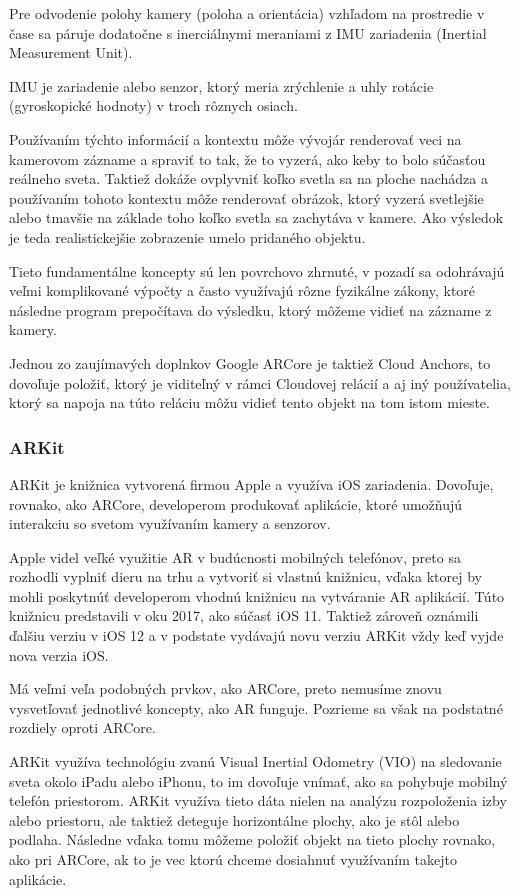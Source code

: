 Pre odvodenie polohy kamery (poloha a orientácia) vzhľadom na prostredie v čase sa páruje dodatočne s inerciálnymi meraniami z IMU zariadenia (Inertial Measurement Unit). \cite{conway2023arcore}

IMU je zariadenie alebo senzor, ktorý meria zrýchlenie a uhly rotácie (gyroskopické hodnoty) v troch rôznych osiach. \cite{vectornav2024imu}

Používaním týchto informácií a kontextu môže vývojár renderovať veci na kamerovom zázname a spraviť to tak, že to vyzerá, ako keby to bolo súčasťou reálneho sveta. Taktiež dokáže ovplyvniť koľko svetla sa na ploche nachádza a používaním tohoto kontextu môže renderovať obrázok, ktorý vyzerá svetlejšie alebo tmavšie na základe toho koľko svetla sa zachytáva v kamere. Ako výsledok je teda realistickejšie zobrazenie umelo pridaného objektu.

Tieto fundamentálne koncepty sú len povrchovo zhrnuté, v pozadí sa odohrávajú veľmi komplikované výpočty a často využívajú rôzne fyzikálne zákony, ktoré následne program prepočítava do výsledku, ktorý môžeme vidieť na zázname z kamery.

Jednou zo zaujímavých doplnkov Google ARCore je taktiež Cloud Anchors, to dovoľuje položiť, ktorý je viditeľný v rámci Cloudovej relácií a aj iný používatelia, ktorý sa napoja na túto reláciu môžu vidieť tento objekt na tom istom mieste. \cite{conway2023arcore}

\subsubsection{ARKit}

ARKit je knižnica vytvorená firmou Apple a využíva iOS zariadenia. Dovoľuje, rovnako, ako ARCore, developerom produkovať aplikácie, ktoré umožňujú interakciu so svetom využívaním kamery a senzorov. 

Apple videl veľké využitie AR v budúcnosti mobilných telefónov, preto sa rozhodli vyplniť dieru na trhu a vytvoriť si vlastnú knižnicu, vďaka ktorej by mohli poskytnúť developerom vhodnú knižnicu na vytváranie AR aplikácií. Túto knižnicu predstavili v oku 2017, ako súčasť iOS 11. Taktiež zároveň oznámili ďalšiu verziu v iOS 12 a v podstate vydávajú novu verziu ARKit vždy keď vyjde nova verzia iOS. 

Má veľmi veľa podobných prvkov, ako ARCore, preto nemusíme znovu vysvetľovať jednotlivé koncepty, ako AR funguje. Pozrieme sa však na podstatné rozdiely oproti ARCore.

ARKit využíva technológiu zvanú Visual Inertial Odometry (VIO) na sledovanie sveta okolo iPadu alebo iPhonu, to im dovoľuje vnímať, ako sa pohybuje mobilný telefón priestorom. ARKit využíva tieto dáta nielen na analýzu rozpoloženia izby alebo priestoru, ale taktiež deteguje horizontálne plochy, ako je stôl alebo podlaha. Následne vďaka tomu môžeme položiť objekt na tieto plochy rovnako, ako pri ARCore, ak to je vec ktorú chceme dosiahnuť využívaním takejto aplikácie.

